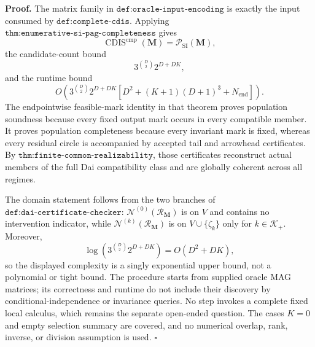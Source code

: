 \textbf{Proof.}
The matrix family in \(\texttt{def:oracle-input-encoding}\) is exactly the input consumed by \(\texttt{def:complete-cdis}\).  Applying \(\texttt{thm:enumerative-si-pag-completeness}\) gives
\[
\operatorname{CDIS}^{\mathrm{cmp}}(\mathbf M)
=\mathcal P_{\mathrm{SI}}(\mathbf M),
\]
the candidate-count bound
\[
3^{\binom D2}2^{D+DK},
\]
and the runtime bound
\[
O\!\left(
3^{\binom D2}2^{D+DK}
\left[D^2+(K+1)(D+1)^3+N_{\mathrm{end}}\right]
\right).
\]
The endpointwise feasible-mark identity in that theorem proves population soundness because every fixed output mark occurs in every compatible member.  It proves population completeness because every invariant mark is fixed, whereas every residual circle is accompanied by accepted tail and arrowhead certificates.  By \(\texttt{thm:finite-common-realizability}\), those certificates reconstruct actual members of the full Dai compatibility class and are globally coherent across all regimes.

The domain statement follows from the two branches of \(\texttt{def:dai-certificate-checker}\): \(\mathcal N^{(0)}(\mathcal R_{\mathbf M})\) is on \(V\) and contains no intervention indicator, while \(\mathcal N^{(k)}(\mathcal R_{\mathbf M})\) is on \(V\cup\{\zeta_k\}\) only for \(k\in\mathcal K_+\).  Moreover,
\[
\log\!\left(3^{\binom D2}2^{D+DK}\right)=O(D^2+DK),
\]
so the displayed complexity is a singly exponential upper bound, not a polynomial or tight bound.  The procedure starts from supplied oracle MAG matrices; its correctness and runtime do not include their discovery by conditional-independence or invariance queries.  No step invokes a complete fixed local calculus, which remains the separate open-ended question.  The cases \(K=0\) and empty selection summary are covered, and no numerical overlap, rank, inverse, or division assumption is used. \(\square\)